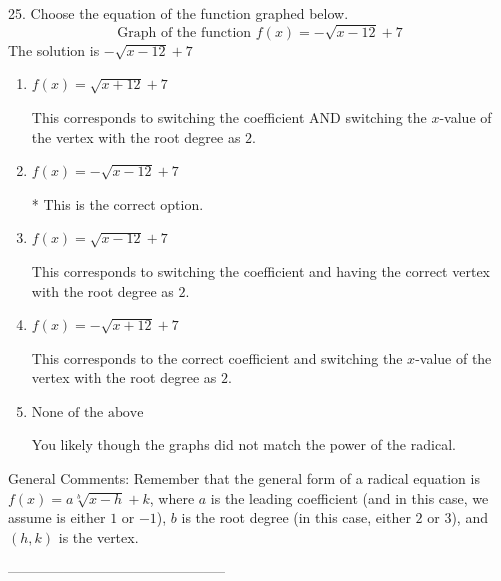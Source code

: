\documentclass{article}[14pt]
\begin{document}
25. Choose the equation of the function graphed below.
$$ \text{Graph of the function } f(x) = - \sqrt{x - 12} + 7 $$ 
The solution is $ - \sqrt{x - 12} + 7 $ 

\begin{enumerate}[label=\Alph*.] 
\item $ f(x) = \sqrt{x + 12} + 7 $ 

 This corresponds to switching the coefficient AND switching the $x$-value of the vertex with the root degree as $2$. 
\item $ f(x) = - \sqrt{x - 12} + 7 $ 

 * This is the correct option. 
\item $ f(x) = \sqrt{x - 12} + 7 $ 

 This corresponds to switching the coefficient and having the correct vertex with the root degree as $2$. 
\item $ f(x) = - \sqrt{x + 12} + 7 $ 

 This corresponds to the correct coefficient and switching the $x$-value of the vertex with the root degree as $2$. 
\item $ \text{None of the above} $ 

 You likely though the graphs did not match the power of the radical. 
\end{enumerate} 
 
General Comments: Remember that the general form of a radical equation is $ f(x) = a \sqrt[b]{x - h} + k$, where $a$ is the leading coefficient (and in this case, we assume is either $1$ or $-1$), $b$ is the root degree (in this case, either $2$ or $3$), and $(h, k)$ is the vertex.

-----------------------------------------------
\end{document}
